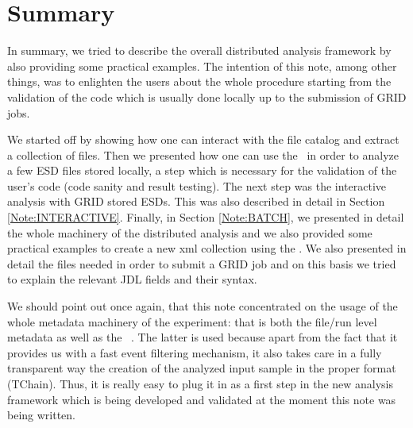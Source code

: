 \section{Summary}
\label{Note:SUMMARY}

In summary, we tried to describe the overall distributed analysis framework by also providing some practical examples. The intention of this note, among other things, was to enlighten the users about the whole procedure starting from the validation of the code which is usually done locally up to the submission of GRID jobs. 

We started off by showing how one can interact with the file catalog and extract a collection of files. Then we presented how one can use the \tag\ in order to analyze a few ESD files stored locally, a step which is necessary for the validation of the user's code (code sanity and result testing). The next step was the interactive analysis with GRID stored ESDs. This was also described in detail in Section \ref{Note:INTERACTIVE}. Finally, in Section \ref{Note:BATCH}, we presented in detail the whole machinery of the distributed analysis and we also provided some practical examples to create a new xml collection using the \tag. We also presented in detail the files needed in order to submit a GRID job and on this basis we tried to explain the relevant JDL fields and their syntax.

We should point out once again, that this note concentrated on the usage of the whole metadata machinery of the experiment: that is both the file/run level metadata \cite{Note:RefFileCatalogMetadataNote} as well as the \tag\ \cite{Note:RefEventTagNote}. The latter is used because apart from the fact that it provides us with a fast event filtering mechanism, it also takes care in a fully transparent way the creation of the analyzed input sample in the proper format ({\ttfamily TChain}). Thus, it is really easy to plug it in as a first step in the new analysis framework \cite{Note:RefIlcenTutorial,Note:RefAnalysisFramework} which is being developed and validated at the moment this note was being written.